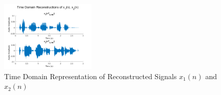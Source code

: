 \documentclass[journal]{IEEEtran}
\begin{document}
\begin{figure}
    \begin{center}
        \includegraphics[width=0.4\textwidth]{time_recon.png}
        \caption{\label{fig:time_recon} Time Domain Representation of Reconstructed Signals \(x_1(n)\) and \(x_2(n)\)}
    \end{center}
\end{figure}

\end{document}
